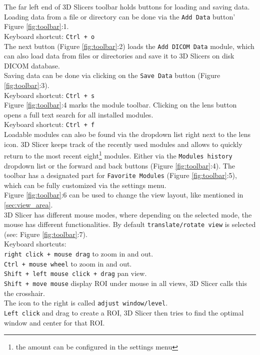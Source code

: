 \noindent
The far left end of 3D Slicers toolbar holds buttons for loading and saving data.
Loading data  from a file or directory can be done via the \texttt{Add Data} button' Figure \ref{fig:toolbar}:1.\\
Keyboard shortcut: \texttt{Ctrl + o}\\
The next button (Figure \ref{fig:toolbar}:2) loads the \texttt{Add DICOM Data} module, which can also load data from files or directories and save it to 3D Slicers on disk DICOM database.\\
Saving data can be done via clicking on the \texttt{Save Data} button (Figure \ref{fig:toolbar}:3).\\Keyboard shortcut: \texttt{Ctrl + s}\\
Figure \ref{fig:toolbar}:4 marks the module toolbar. Clicking on the lens button opens a full text search for all installed modules.\\
Keyboard shortcut: \texttt{Ctrl + f}\\
Loadable modules can also be found via the dropdown list right next to the lens icon.
3D Slicer keeps track of the recently used modules and allows to quickly return to the most recent eight\footnote{the amount can be configured in the settings menu} modules.
Either via the \texttt{Modules history} dropdown list or the forward and back buttons (Figure \ref{fig:toolbar}:4).
The toolbar has a designated part for \texttt{Favorite Modules} (Figure \ref{fig:toolbar}:5), which can be fully customized via the settings menu.\\
Figure \ref{fig:toolbar}:6 can be used to change the view layout, like mentioned in \cref{sec:view_area}.\\
3D Slicer has different mouse modes, where depending on the selected mode, the mouse has different functionalities. By default \texttt{translate/rotate view} is selected (see: Figure \ref{fig:toolbar}:7).\\
Keyboard shortcuts:\\
\texttt{right click + mouse drag} to zoom in and out.\\
\texttt{Ctrl + mouse wheel} to zoom in and out.\\
\texttt{Shift + left mouse click + drag} pan view.\\
\texttt{Shift + move mouse} display ROI under mouse in all views, 3D Slicer calls this the crosshair.\\
\noindent
The icon to the right is called \texttt{adjust window/level}.\\
\texttt{Left click} and drag to create a ROI, 3D Slicer then tries to find the optimal window and center for that ROI.\\
